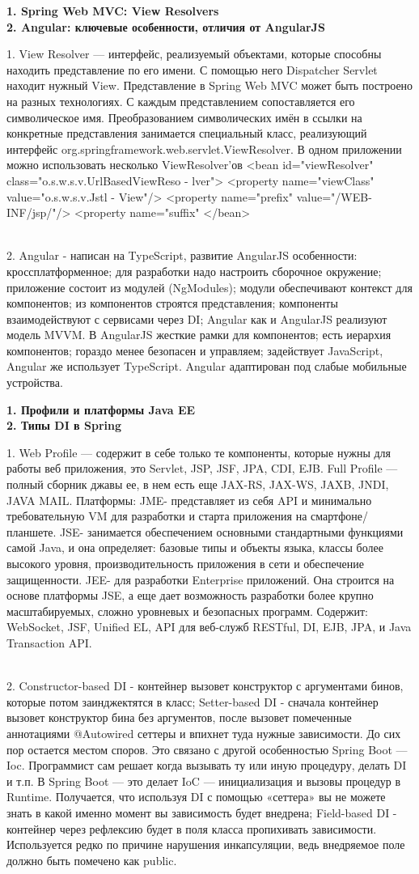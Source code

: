 \documentclass{article}
\newcommand{\bil}[4]{%
    \begin{minipage}{.3\textwidth}
        \textbf{1. #1} \\
        \textbf{2. #2}

        1. #3
        \\
        2. #4
    \end{minipage}
}
\begin{document}
\bil{Spring Web MVC: View Resolvers}{Angular: ключевые особенности, отличия от AngularJS}{
    View Resolver — интерфейс, реализуемый объектами, которые способны находить представление по его имени. 
    С помощью него Dispatcher Servlet находит нужный View.
    Представление в Spring Web MVC может быть построено на разных технологиях.
    С каждым представлением сопоставляется его символическое имя.
    Преобразованием символических имён в ссылки на конкретные представления занимается специальный класс, реализующий интерфейс org.springframework.web.servlet.ViewResolver.
    В одном приложении можно использовать несколько ViewResolver'ов
    <bean id="viewResolver" class="o.s.w.s.v.UrlBasedViewReso - lver"> <property name="viewClass"
              value="o.s.w.s.v.Jstl - View"/>
    <property name="prefix"
              value="/WEB-INF/jsp/"/>
    <property name="suffix"
</bean>
}{
    Angular - написан на TypeScript, развитие AngularJS
    особенности:
    кроссплатформенное;
    для разработки надо настроить сборочное окружение;
    приложение состоит из модулей (NgModules);
    модули обеспечивают контекст для компонентов;
    из компонентов строятся представления;
    компоненты взаимодействуют с сервисами через DI;
    Angular как и AngularJS реализуют модель MVVM.
    В AngularJS жесткие рамки для компонентов; есть иерархия компонентов; гораздо менее безопасен и управляем; задействует JavaScript, Angular же использует TypeScript.
    Angular адаптирован под слабые мобильные устройства.

}
\hfill
\bil{Профили и платформы Java EE}{Типы DI в Spring}{
    Web Profile — содержит в себе только те компоненты, которые нужны для работы веб приложения, это Servlet, JSP, JSF, JPA, CDI, EJB.
Full Profile — полный сборник джавы ее, в нем есть еще JAX-RS, JAX-WS, JAXB, JNDI, JAVA MAIL.
Платформы: JME- представляет из себя API и минимально требовательную VM для разработки и старта приложения на смартфоне/планшете. JSE- занимается обеспечением основными стандартными функциями самой Java, и она определяет: базовые типы и объекты языка, классы более высокого уровня, 
производительность приложения в сети и обеспечение защищенности.
JEE- для разработки Enterprise приложений. Она строится на основе платформы JSE, а еще дает возможность разработки более крупно масштабируемых, сложно уровневых и безопасных программ. Содержит: WebSocket, JSF, Unified EL, API для веб-служб RESTful, DI, EJB, JPA, и Java Transaction API.
}{
    Constructor-based DI - контейнер вызовет конструктор с аргументами бинов, которые потом заинджектятся в класс; 
    Setter-based DI - сначала контейнер вызовет конструктор бина без аргументов, после вызовет помеченные аннотациями @Autowired сеттеры и впихнет туда нужные зависимости. До сих пор остается местом споров. Это связано с другой особенностью Spring Boot — Ioc. Программист сам решает когда вызывать ту или иную процедуру, делать DI и т.п. В Spring Boot — это делает IoC — инициализация и вызовы процедур в Runtime. Получается, что используя DI с помощью «сеттера» вы не можете знать в какой именно момент вы зависимость будет внедрена; 
    Field-based DI - контейнер через рефлексию будет в поля класса пропихивать зависимости. Используется редко по причине нарушения инкапсуляции, ведь внедряемое поле должно быть помечено как public.
}
\end{document}
